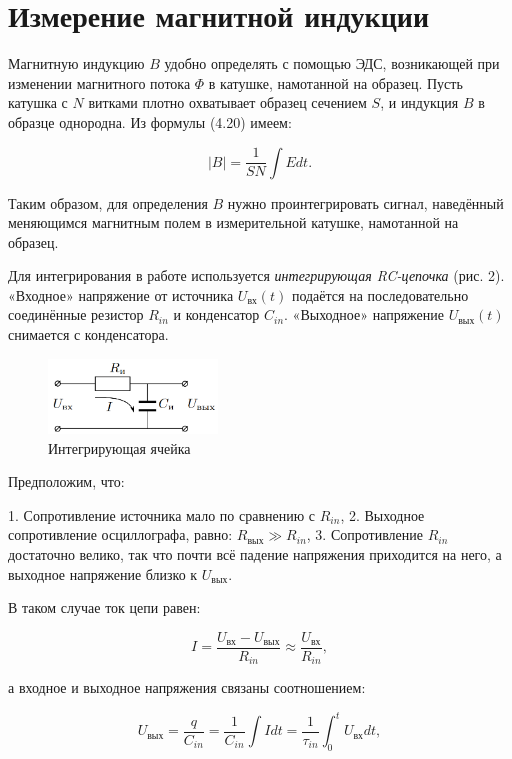 \documentclass[12pt,a4paper]{article}
\begin{document}
\section{Измерение магнитной индукции}

Магнитную индукцию $B$ удобно определять с помощью ЭДС, возникающей при изменении магнитного потока $\Phi$ в катушке, намотанной на образец. Пусть катушка с $N$ витками плотно охватывает образец сечением $S$, и индукция $B$ в образце однородна. Из формулы (4.20) имеем:

\begin{equation}
|B| = \frac{1}{SN} \int E dt.
\end{equation}

Таким образом, для определения $B$ нужно проинтегрировать сигнал, наведённый меняющимся магнитным полем в измерительной катушке, намотанной на образец.

Для интегрирования в работе используется \textit{интегрирующая RC-цепочка} (рис. 2). «Входное» напряжение от источника $U_{\text{вх}}(t)$ подаётся на последовательно соединённые резистор $R_{in}$ и конденсатор $C_{in}$. «Выходное» напряжение $U_{\text{вых}}(t)$ снимается с конденсатора. 

\begin{figure}[h!]
    \centering
    \includegraphics[width=0.4\textwidth]{integrating_circuit.png}
    \caption{Интегрирующая ячейка}
\end{figure}

Предположим, что:

1. Сопротивление источника мало по сравнению с $R_{in}$,
2. Выходное сопротивление осциллографа, равно: $R_{\text{вых}} \gg R_{in}$, 
3. Сопротивление $R_{in}$ достаточно велико, так что почти всё падение напряжения приходится на него, а выходное напряжение близко к $U_{\text{вых}}$.

В таком случае ток цепи равен:

\[
I = \frac{U_{\text{вх}} - U_{\text{вых}}}{R_{in}} \approx \frac{U_{\text{вх}}}{R_{in}},
\]

а входное и выходное напряжения связаны соотношением:

\[
U_{\text{вых}} = \frac{q}{C_{in}} = \frac{1}{C_{in}} \int I dt = \frac{1}{\tau_{in}} \int_0^t U_{\text{вх}} dt,
\]
\end{document}
